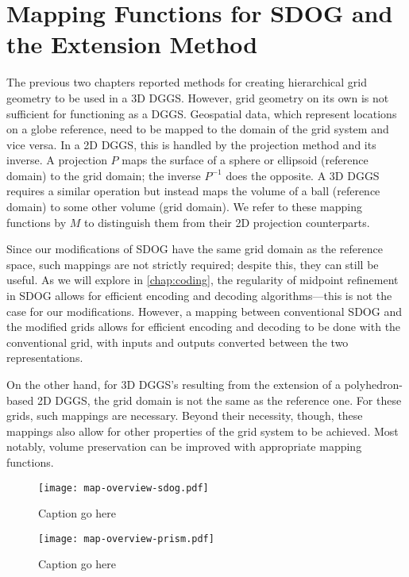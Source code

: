 \chapter{Mapping Functions for SDOG and the Extension Method} \label{chap:mapping}
The previous two chapters reported methods for creating hierarchical grid geometry to be used in a 3D DGGS.
However, grid geometry on its own is not sufficient for functioning as a DGGS.
Geospatial data, which represent locations on a globe reference, need to be mapped to the domain of the grid system and vice versa.
In a 2D DGGS, this is handled by the projection method and its inverse.
A projection $P$ maps the surface of a sphere or ellipsoid (reference domain) to the grid domain; the inverse $P^{-1}$ does the opposite.
A 3D DGGS requires a similar operation but instead maps the volume of a ball (reference domain) to some other volume (grid domain).
We refer to these mapping functions by $M$ to distinguish them from their 2D projection counterparts.


Since our modifications of SDOG have the same grid domain as the reference space, such mappings are not strictly required; despite this, they can still be useful.
As we will explore in \cref{chap:coding}, the regularity of midpoint refinement in SDOG allows for efficient encoding and decoding algorithms---this is not the case for our modifications.
However, a mapping between conventional SDOG and the modified grids allows for efficient encoding and decoding to be done with the conventional grid, with inputs and outputs converted between the two representations.


On the other hand, for 3D DGGS's resulting from the extension of a polyhedron-based 2D DGGS, the grid domain is not the same as the reference one.
For these grids, such mappings are necessary.
Beyond their necessity, though, these mappings also allow for other properties of the grid system to be achieved. Most notably, volume preservation can be improved with appropriate mapping functions.


\begin{figure}[ht!]
	\centering
	\texttt{[image: map-overview-sdog.pdf]}
	\caption[Title]{
		Caption go here
	}
	\label{fig:map-overview-sdog}
\end{figure}


\begin{figure}[ht!]
	\centering
	\texttt{[image: map-overview-prism.pdf]}
	\caption[Title]{
		Caption go here
	}
	\label{fig:map-overview-prism}
\end{figure}


